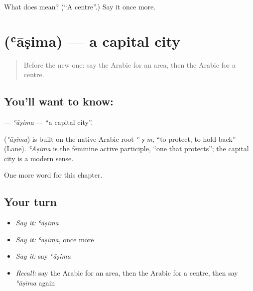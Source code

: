 \begin{tcolorbox}[breakable,colback=teal!4,colframe=teal!35!black,title={Before you move on}]
What does  mean? (\textquotedblleft{}A centre\textquotedblright{}.) Say it once more.
\end{tcolorbox}
\section[\texorpdfstring{\ar{عاصمة} (ʿāṣima)}{عاصمة (ʿāṣima)}]{ (ʿāṣima) — a capital city}

\label{lesson:AR-C204-asima}



\begin{quote}
Before the new one: say the Arabic for an area, then the Arabic for a centre.
\end{quote}

\subsection*{You'll want to know: }
\textbf{} — \emph{ʿāṣima} — \textquotedblleft{}a capital city\textquotedblright{}.

\begin{cousinweb}
\textbf{} (\emph{ʿāṣima}) is built on the native Arabic root \emph{ʿ-ṣ-m}, \textquotedblleft{}to protect, to hold back\textquotedblright{} (Lane). \emph{ʿĀṣima} is the feminine active participle, \textquotedblleft{}one that protects\textquotedblright{}; the capital city is a modern sense.
\end{cousinweb}

\begin{grammarlens}[title={What you've built}]
One more word for this chapter.
\end{grammarlens}

\subsection*{Your turn}
\begin{itemize}
\raggedright
  \item \emph{Say it:} \emph{ʿāṣima}
  \item \emph{Say it:} \emph{ʿāṣima}, once more
  \item \emph{Say it:} say \emph{ʿāṣima}
  \item \emph{Recall:} say the Arabic for an area, then the Arabic for a centre, then say \emph{ʿāṣima} again
\end{itemize}

